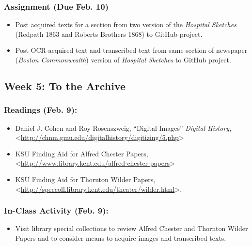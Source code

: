 \documentclass[]{article}
\begin{document}
\subsubsection{Assignment (Due Feb. 10)}\label{assignment-due-feb.-10}

\begin{itemize}
\itemsep1pt\parskip0pt
\item
  Post acquired texts for a section from two version of the
  \emph{Hospital Sketches} (Redpath 1863 and Roberts Brothers 1868) to
  GitHub project.
\item
  Post OCR-acquired text and transcribed text from same section of
  newspaper (\emph{Boston Commonwealth}) version of \emph{Hospital
  Sketches} to GitHub project.
\end{itemize}

\subsection{Week 5: To the Archive}\label{week-5-to-the-archive}

\subsubsection{Readings (Feb. 9):}\label{readings-feb.-9}

\begin{itemize}
\itemsep1pt\parskip0pt
\item
  Daniel J. Cohen and Roy Rosenszweig, ``Digital Images'' \emph{Digital
  History,}
  \textless{}\url{http://chnm.gmu.edu/digitalhistory/digitizing/5.php}\textgreater{}
\item
  KSU Finding Aid for Alfred Chester Papers,
  \textless{}\url{http://www.library.kent.edu/alfred-chester-papers}\textgreater{}
\item
  KSU Finding Aid for Thornton Wilder Papers,
  \textless{}\url{http://speccoll.library.kent.edu/theater/wilder.html}\textgreater{}.
\end{itemize}

\subsubsection{In-Class Activity (Feb.
9):}\label{in-class-activity-feb.-9}

\begin{itemize}
\itemsep1pt\parskip0pt
\item
  Visit library special collections to review Alfred Chester and
  Thornton Wilder Papers and to consider means to acquire images and
  transcribed texts.
\end{itemize}
\end{document}
